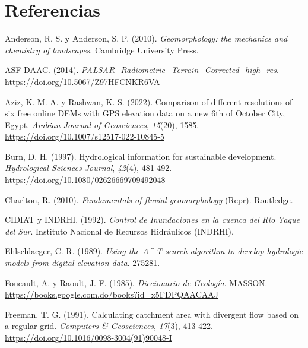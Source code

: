 \documentclass[spanish]{article}
\newlength{\cslhangindent}
\newlength{\cslentryspacingunit} %
\newenvironment{CSLReferences}[2] %
 {%
  \setlength{\parindent}{0pt}
  \ifodd #1
  \let\oldpar\par
  \def\par{\hangindent=\cslhangindent\oldpar}
  \fi
  \setlength{\parskip}{#2\cslentryspacingunit}
 }%
 {}
\begin{document}
\hypertarget{referencias}{%
\section*{Referencias}\label{referencias}}

\hypertarget{refs}{}
\begin{CSLReferences}{1}{0}
\leavevmode{}%
Anderson, R. S. y Anderson, S. P. (2010). \emph{Geomorphology: the
mechanics and chemistry of landscapes}. Cambridge University Press.

\leavevmode{}%
ASF DAAC. (2014).
\emph{PALSAR{\_}Radiometric{\_}Terrain{\_}Corrected{\_}high{\_}res}.
\url{https://doi.org/10.5067/Z97HFCNKR6VA}

\leavevmode{}%
Aziz, K. M. A. y Rashwan, K. S. (2022). Comparison of different
resolutions of six free online DEMs with GPS elevation data on a new 6th
of October City, Egypt. \emph{Arabian Journal of Geosciences},
\emph{15}(20), 1585. \url{https://doi.org/10.1007/s12517-022-10845-5}

\leavevmode{}%
Burn, D. H. (1997). Hydrological information for sustainable
development. \emph{Hydrological Sciences Journal}, \emph{42}(4),
481-492. \url{https://doi.org/10.1080/02626669709492048}

\leavevmode{}%
Charlton, R. (2010). \emph{Fundamentals of fluvial geomorphology}
(Repr). Routledge.

\leavevmode{}%
CIDIAT y INDRHI. (1992). \emph{{Control de Inundaciones en la cuenca del
Río Yaque del Sur}}. {Instituto Nacional de Recursos Hidráulicos
(INDRHI)}.

\leavevmode{}%
Ehlschlaeger, C. R. (1989). \emph{Using the A{\^{}} T search algorithm
to develop hydrologic models from digital elevation data}. 275281.

\leavevmode{}%
Foucault, A. y Raoult, J. F. (1985). \emph{Diccionario de Geología}.
MASSON. \url{https://books.google.com.do/books?id=x5FDPQAACAAJ}

\leavevmode{}%
Freeman, T. G. (1991). Calculating catchment area with divergent flow
based on a regular grid. \emph{Computers \& Geosciences}, \emph{17}(3),
413-422. \url{https://doi.org/10.1016/0098-3004(91)90048-I}


\end{CSLReferences}
\end{document}

